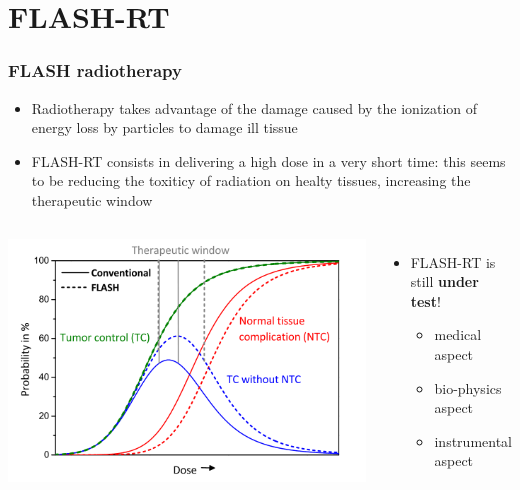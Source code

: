 \section{FLASH-RT}

    \begin{frame}
        \frametitle{FLASH radiotherapy}
        \begin{itemize}
            \item Radiotherapy takes advantage of the damage caused by the ionization of energy loss by particles to damage ill tissue
            \item FLASH-RT consists in delivering a high dose in a very short time: this seems to be reducing the toxiticy of radiation on healty tissues, increasing the therapeutic window
        \end{itemize}
        \medskip
        \begin{columns}
                \includegraphics[width=1.25\linewidth]{figures/pixel_detectors_usage/curve_flash.png}
            
            \begin{itemize}
                \item FLASH-RT is still \textbf{under test}!
                \begin{itemize}
                    \item medical aspect%
                    \item  bio-physics aspect%
                    \item  instrumental aspect%
                \end{itemize}
            \end{itemize}
        \end{columns}
    \end{frame} 


